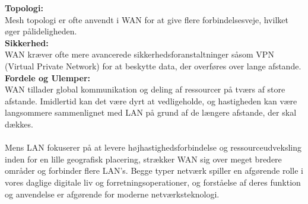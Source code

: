 \noindent\textbf{Topologi:}\\
Mesh topologi er ofte anvendt i WAN for at give flere forbindelsesveje, hvilket øger pålideligheden.\\


\noindent\textbf{Sikkerhed:}\\
WAN kræver ofte mere avancerede sikkerhedsforanstaltninger såsom VPN (Virtual Private Network) for at beskytte data, der overføres over lange afstande.\\


\noindent\textbf{Fordele og Ulemper:}\\
WAN tillader global kommunikation og deling af ressourcer på tværs af store afstande. Imidlertid kan det være dyrt at vedligeholde, og hastigheden kan være langsommere sammenlignet med LAN på grund af de længere afstande, der skal dækkes.
\\
\\
Mens LAN fokuserer på at levere højhastighedsforbindelse og ressourceudveksling inden for en lille geografisk placering, strækker WAN sig over meget bredere områder og forbinder flere LAN's. Begge typer netværk spiller en afgørende rolle i vores daglige digitale liv og forretningsoperationer, og forståelse af deres funktion og anvendelse er afgørende for moderne netværksteknologi.
